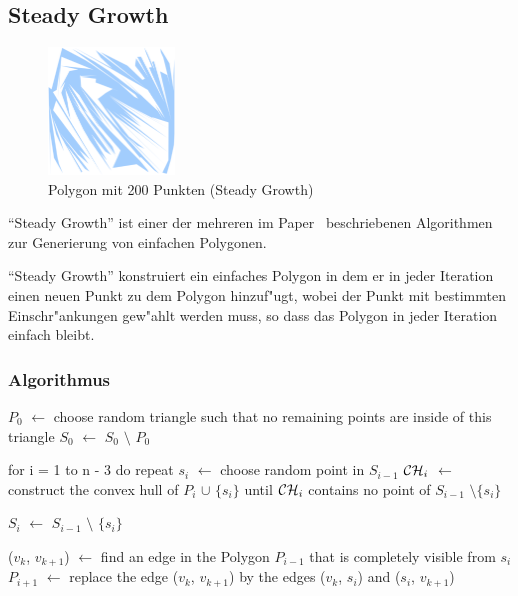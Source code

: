 
\subsection{Steady Growth}

  \begin{figure}[h]
    \begin{center}
      \includegraphics[width=0.3\textwidth]{img/steady200.eps}
    \end{center}
    \caption{Polygon mit 200 Punkten (Steady Growth)}
    \label{fig:steady200}
  \end{figure}

  \enquote{Steady Growth} ist einer der mehreren im Paper~\cite{held98polygons}
  beschriebenen Algorithmen zur Generierung von einfachen Polygonen.

  \enquote{Steady Growth} konstruiert ein einfaches Polygon in dem er in jeder
  Iteration einen neuen Punkt zu dem Polygon hinzuf"ugt, wobei der Punkt mit
  bestimmten Einschr"ankungen gew"ahlt werden muss, so dass das Polygon in jeder
  Iteration einfach bleibt.

  \subsubsection{Algorithmus}

\begin{code}[caption={Steady Growth}, mathescape=true]
$P_0$ $\leftarrow$ choose random triangle such that no remaining points are inside of this triangle
$S_0$ $\leftarrow$ $S_0$ $\setminus$ $P_0$

for i = 1 to n - 3 do
  repeat
    $s_i$ $\leftarrow$ choose random point in $S_{i-1}$
    $\mathcal{CH}_i$ $\leftarrow$ construct the convex hull of $P_i$ $\cup$ $\{s_i\}$
  until $\mathcal{CH}_i$ contains no point of $S_{i-1}$ $\setminus \{s_i\}$

  $S_i$ $\leftarrow$ $S_{i-1}$ $\setminus$ $\{s_i\}$

  ($v_k$, $v_{k+1}$) $\leftarrow$ find an edge in the Polygon $P_{i-1}$ that is completely visible from $s_i$
  $P_{i+1}$ $\leftarrow$ replace the edge ($v_k$, $v_{k+1}$) by the edges ($v_k$, $s_i$) and ($s_i$, $v_{k+1}$)

\end{code}

